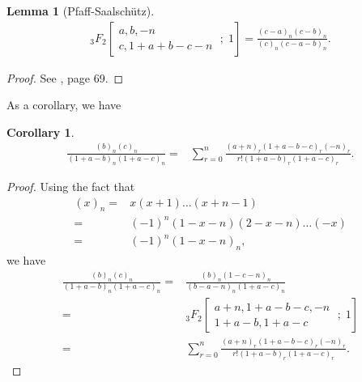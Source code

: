\documentclass[reqno]{amsart}
\newtheorem{lemma}[theorem]{Lemma}
\newtheorem{corollary}[theorem]{Corollary}
\theoremstyle{definition}
\theoremstyle{remark}
\numberwithin{equation}{section}
\begin{document}
\begin{lemma}[Pfaff-Saalsch\"utz]\label{lemma8}
\begin{align}
_3F_2\left[\begin{aligned} a, b, -n \hspace{1cm}\\c, 1+a+b-c-n\end{aligned}\;;\;1\right]=\frac{(c-a)_n(c-b)_n}{(c)_n(c-a-b)_n}.
\end{align}
\end{lemma}
\begin{proof}
See \cite{4}, page 69.
\end{proof}
As a corollary, we have
\begin{corollary}\label{corollary2}
\begin{align*}
\frac{(b)_n(c)_n}{(1+a-b)_n(1+a-c)_n}=&\sum_{r=0}^n\frac{(a+n)_r (1+a-b-c)_r(-n)_r}{r! (1+a-b)_r(1+a-c)_r}.
\end{align*}
\end{corollary}
\begin{proof}
Using the fact that
\begin{align*}
(x)_n=&x(x+1)\ldots(x+n-1)\\=&(-1)^n(1-x-n)(2-x-n)\ldots (-x)\\=&(-1)^n(1-x-n)_n,\end{align*}
we have
\begin{align*}
\frac{(b)_n(c)_n}{(1+a-b)_n(1+a-c)_n}=&\frac{(b)_n(1-c-n)_n}{(b-a-n)_n(1+a-c)_n}\\
=&_3F_2\left[\begin{aligned} a+n, 1+a-b-c, -n \\1+a-b, 1+a-c\quad \end{aligned}\;;\;1\right]\\
=&\sum_{r=0}^n\frac{(a+n)_r (1+a-b-c)_r(-n)_r}{r! (1+a-b)_r(1+a-c)_r}.
\end{align*}
\end{proof}
\end{document}

